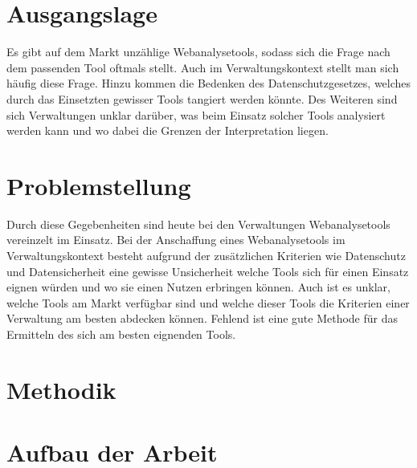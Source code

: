 
\section{Ausgangslage}
Es gibt auf dem Markt unzählige Webanalysetools, sodass sich die Frage nach dem passenden Tool oftmals stellt. Auch im Verwaltungskontext stellt man sich häufig diese Frage. Hinzu kommen die Bedenken des Datenschutzgesetzes, welches durch das Einsetzten gewisser Tools tangiert werden könnte. Des Weiteren sind sich Verwaltungen unklar darüber, was beim Einsatz solcher Tools analysiert werden kann und wo dabei die Grenzen der Interpretation liegen.

\section{Problemstellung}

Durch diese Gegebenheiten sind heute bei den Verwaltungen Webanalysetools vereinzelt im Einsatz. Bei der Anschaffung eines Webanalysetools im Verwaltungskontext besteht aufgrund der zusätzlichen Kriterien wie Datenschutz und Datensicherheit eine gewisse Unsicherheit welche Tools sich für einen Einsatz eignen würden und wo sie einen Nutzen erbringen können. Auch ist es unklar, welche Tools am Markt verfügbar sind und welche dieser Tools die Kriterien einer Verwaltung am besten abdecken können. Fehlend ist eine gute Methode für das Ermitteln des sich am besten eignenden Tools.

\section{Methodik}


\section{Aufbau der Arbeit}

